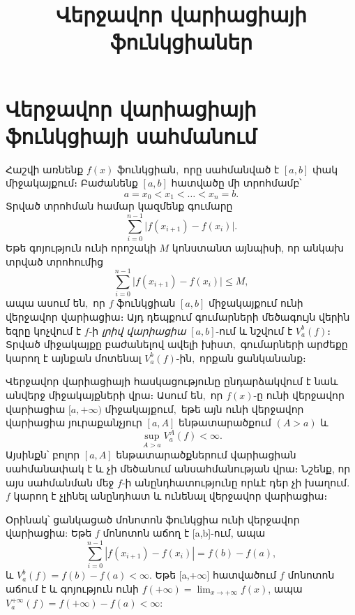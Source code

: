 \documentclass[12pt]{article}
\begin{document}
\title{Վերջավոր վարիացիայի ֆունկցիաներ}
\author{}
\date{}
\maketitle

\section{Վերջավոր վարիացիայի ֆունկցիայի սահմանում}
Հաշվի առնենք \(f(x)\) ֆունկցիան\(,\) որը սահմանված է \([a,b]\) փակ միջակայքում։ Բաժանենք \([a,b]\) հատվածը մի տրոհմամբ՝
\[
a = x_0 < x_1 < \dots < x_n = b.
\]
Տրված տրոհման համար կազմենք գումարը
\begin{equation}\label{eq:var-sum}
\sum_{i=0}^{n-1} \bigl|f(x_{i+1}) - f(x_i)\bigr|.
\end{equation}
Եթե գոյություն ունի որոշակի \(M\) կոնստանտ այնպիսի, որ անկախ տրված տրոհումից
\[
\sum_{i=0}^{n-1} \bigl|f(x_{i+1}) - f(x_i)\bigr| \le M,
\]
ապա ասում են\(,\) որ \(f\) ֆունկցիան \([a,b]\) միջակայքում ունի վերջավոր վարիացիա\(։\) Այդ դեպքում գումարների մեծագույն վերին եզրը կոչվում է \(f\)-ի \emph{լրիվ վարիացիա} \([a,b]\)-ում և նշվում է \(V_a^b(f)։\) Տրված միջակայքը բաժանելով ավելի խիստ\(,\) գումարների արժեքը կարող է այնքան մոտենալ \(V_a^b(f)\)-ին\(,\) որքան ցանկանանք\(։\)

Վերջավոր վարիացիայի հասկացությունը ընդարձակվում է նաև անվերջ միջակայքների վրա։ Ասում են\(,\) որ \( f(x) \)-ը ունի վերջավոր վարիացիա \( [a, +\infty) \) միջակայքում\(,\) եթե այն ունի վերջավոր վարիացիա յուրաքանչյուր \( [a, A] \) ենթատարածքում \( (A > a) \) և
\[
\sup_{A > a} V_a^A(f) < \infty.
\]
Այսինքն՝ բոլոր \( [a, A] \) ենթատարածքներում վարիացիան սահմանափակ է և չի մեծանում անսահմանության վրա։ Նշենք, որ այս սահմանման մեջ \( f \)-ի անընդհատությունը որևէ դեր չի խաղում. \( f \) կարող է չլինել անընդհատ և ունենալ վերջավոր վարիացիա։


Օրինակ՝ ցանկացած մոնոտոն ֆունկցիա ունի վերջավոր վարիացիա: Եթե \(f\) մոնոտոն աճող է [a,b]-ում, ապա
\[
\sum_{i=0}^{n-1} |f(x_{i+1})-f(x_i)| = f(b)-f(a),
\]
և \(V_a^b(f)=f(b)-f(a)<\infty\). Եթե [a,+\(\infty\)] հատվածում \(f\) մոնոտոն աճում է և գոյություն ունի \(f(+\infty)=\lim_{x\to+\infty}f(x)\), ապա \(V_a^{+\infty}(f)=f(+\infty)-f(a)<\infty\):
\end{document}
